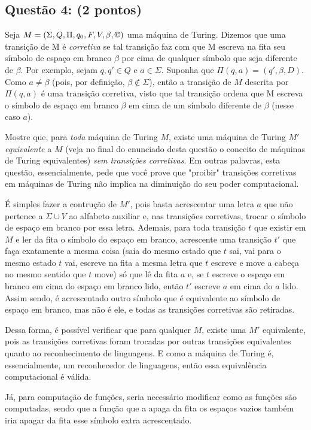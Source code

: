 \documentclass{article}
\begin{document}
\subsection*{Questão 4: (2 pontos)} Seja $M = (\Sigma, Q, \Pi, q_0, F, V, \beta, \copyright)$ uma máquina de Turing. Dizemos que uma transição de M é \textit{corretiva} se tal transição faz com que M escreva na fita seu símbolo de espaço em branco $\beta$ por cima de qualquer símbolo que seja diferente de $\beta$. Por exemplo, sejam $q, q' \in Q$ e $a \in \Sigma$. Suponha que $\Pi(q, a) = (q', \beta, D)$. Como $a \neq \beta$ (pois, por definição, $\beta \notin \Sigma$), então a transição de $M$ descrita por $\Pi(q, a)$ é uma transição corretiva, visto que tal transição ordena que M escreva o símbolo de espaço em branco $\beta$ em cima de um símbolo diferente de $\beta$ (nesse caso $a$).
\par Mostre que, para \textit{toda} máquina de Turing $M$, existe uma máquina de Turing $M'$ \textit{equivalente} a $M$ (veja no final do enunciado desta questão o conceito de máquinas de Turing equivalentes) \textit{sem transições corretivas}. Em outras palavras, esta questão, essencialmente, pede que você prove que "proibir" transições corretivas em máquinas de Turing não implica na diminuição do seu poder computacional.

{
\color{blue}
  \par É simples fazer a contrução de $M'$, pois basta acrescentar uma letra $a$ que não pertence a $\Sigma \cup V$ ao alfabeto auxiliar e, nas transições corretivas, trocar o símbolo de espaço em branco por essa letra. Ademais, para toda transição $t$ que existir em $M$ e ler da fita o símbolo do espaço em branco, acrescente uma transição $t'$ que faça exatamente a mesma coisa (saia do mesmo estado que $t$ sai, vai para o mesmo estado $t$ vai, escreve na fita a mesma letra que $t$ escreve e move a cabeça no mesmo sentido que $t$ move) só que lê da fita $a$ e, se $t$ escreve o espaço em branco em cima do espaço em branco lido, então $t'$ escreve $a$ em cima do $a$ lido. Assim sendo, é acrescentado outro símbolo que é equivalente ao símbolo de espaço em branco, mas não é ele, e todas as transições corretivas são retiradas.
  \par Dessa forma, é possível verificar que para qualquer $M$, existe uma $M'$ equivalente, pois as transições corretivas foram trocadas por outras transições equivalentes quanto ao reconhecimento de linguagens. E como a máquina de Turing é, essencialmente, um reconhecedor de linguagens, então essa equivalência computacional é válida.
  \par Já, para computação de funções, seria necessário modificar como as funções são computadas, sendo que a função que a apaga da fita os espaços vazios também iria apagar da fita esse símbolo extra acrescentado.
}
\end{document}
